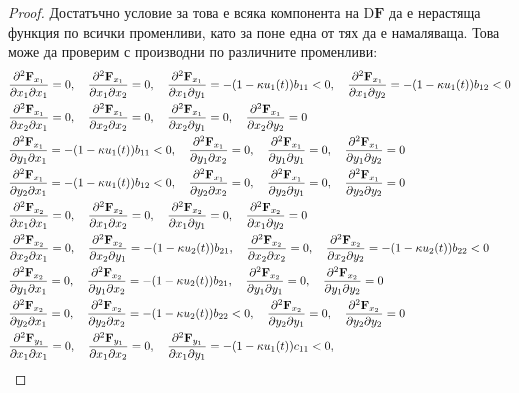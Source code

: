 \begin{proof}
Достатъчно условие за това е всяка компонента на $\mathrm{D}\mathbf{F}$ да е нерастяща функция по всички променливи, като за поне една от тях да е намаляваща. Това може да проверим с производни по различните променливи:
{\allowdisplaybreaks
  \begin{align*}
    &\pdv{\mathbf{F}_{x_1}}{x_1}{x_1} = 0, \quad
    \pdv{\mathbf{F}_{x_1}}{x_1}{x_2} = 0, \quad
    \pdv{\mathbf{F}_{x_1}}{x_1}{y_1} = -(1-\kappa u_1(t)) b_{11} < 0, \quad
    \pdv{\mathbf{F}_{x_1}}{x_1}{y_2} = -(1-\kappa u_1(t)) b_{12} < 0 \\
    &\pdv{\mathbf{F}_{x_1}}{x_2}{x_1} = 0, \quad
    \pdv{\mathbf{F}_{x_1}}{x_2}{x_2} = 0, \quad
    \pdv{\mathbf{F}_{x_1}}{x_2}{y_1} = 0, \quad
    \pdv{\mathbf{F}_{x_1}}{x_2}{y_2} = 0 \\
    &\pdv{\mathbf{F}_{x_1}}{y_1}{x_1} = -(1-\kappa u_1(t)) b_{11} < 0, \quad
    \pdv{\mathbf{F}_{x_1}}{y_1}{x_2} = 0, \quad
    \pdv{\mathbf{F}_{x_1}}{y_1}{y_1} = 0, \quad
    \pdv{\mathbf{F}_{x_1}}{y_1}{y_2} = 0 \\
    &\pdv{\mathbf{F}_{x_1}}{y_2}{x_1} = -(1-\kappa u_1(t)) b_{12} < 0, \quad
    \pdv{\mathbf{F}_{x_1}}{y_2}{x_2} = 0, \quad
    \pdv{\mathbf{F}_{x_1}}{y_2}{y_1} = 0, \quad
    \pdv{\mathbf{F}_{x_1}}{y_2}{y_2} = 0 \\
    &\pdv{\mathbf{F}_{x_2}}{x_1}{x_1} = 0, \quad
    \pdv{\mathbf{F}_{x_2}}{x_1}{x_2} = 0, \quad
    \pdv{\mathbf{F}_{x_2}}{x_1}{y_1} = 0, \quad
    \pdv{\mathbf{F}_{x_2}}{x_1}{y_2} = 0 \\
    &\pdv{\mathbf{F}_{x_2}}{x_2}{x_1} = 0, \quad
    \pdv{\mathbf{F}_{x_2}}{x_2}{y_1} = -(1-\kappa u_2(t)) b_{21}, \quad
    \pdv{\mathbf{F}_{x_2}}{x_2}{x_2} = 0, \quad
    \pdv{\mathbf{F}_{x_2}}{x_2}{y_2} = -(1-\kappa u_2(t)) b_{22} < 0 \\
    &\pdv{\mathbf{F}_{x_2}}{y_1}{x_1} = 0, \quad
    \pdv{\mathbf{F}_{x_2}}{y_1}{x_2} = -(1-\kappa u_2(t)) b_{21}, \quad
    \pdv{\mathbf{F}_{x_2}}{y_1}{y_1} = 0, \quad
    \pdv{\mathbf{F}_{x_2}}{y_1}{y_2} = 0 \\
    &\pdv{\mathbf{F}_{x_2}}{y_2}{x_1} = 0, \quad
    \pdv{\mathbf{F}_{x_2}}{y_2}{x_2} = -(1-\kappa u_2(t)) b_{22} < 0, \quad
    \pdv{\mathbf{F}_{x_2}}{y_2}{y_1} = 0, \quad
    \pdv{\mathbf{F}_{x_2}}{y_2}{y_2} = 0 \\
    &\pdv{\mathbf{F}_{y_1}}{x_1}{x_1} = 0, \quad
    \pdv{\mathbf{F}_{y_1}}{x_1}{x_2} = 0, \quad
    \pdv{\mathbf{F}_{y_1}}{x_1}{y_1} = -(1-\kappa u_1(t))c_{11} < 0, \quad

\end{align*}}
\end{proof}
